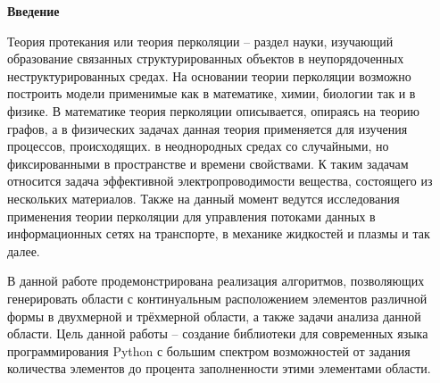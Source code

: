 \begin{center}
\LARGE\bf{Введение}
\end{center}

Теория протекания или теория перколяции – раздел науки, изучающий образование связанных структурированных объектов в неупорядоченных неструктурированных средах. На основании теории перколяции возможно построить модели применимые как в математике, химии, биологии так и в физике. В математике теория перколяции описывается, опираясь на теорию графов, а в физических задачах данная теория применяется для изучения процессов, происходящих. в неоднородных средах со случайными, но фиксированными в пространстве и времени свойствами. К таким задачам относится задача эффективной электропроводимости вещества, состоящего из нескольких материалов. Также на данный момент ведутся исследования применения теории перколяции для управления потоками данных в информационных сетях на транспорте, в механике жидкостей и плазмы и так далее.

В данной работе продемонстрирована реализация алгоритмов, позволяющих генерировать области с континуальным расположением элементов различной формы в двухмерной и трёхмерной области, а также задачи анализа данной области. Цель данной работы – создание библиотеки для современных языка программирования Python с большим спектром возможностей от задания количества элементов до процента заполненности этими элементами области.